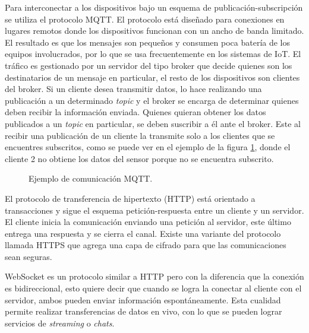 Para interconectar a los dispositivos bajo un esquema de publicación-subscripción se utiliza el protocolo MQTT.
El protocolo está diseñado para conexiones en lugares remotos donde los dispositivos funcionan con un ancho de banda limitado.
El resultado es que los mensajes son pequeños y consumen poca batería de los equipos involucrados, por lo que se usa frecuentemente en los sistemas de IoT.
El tráfico es gestionado por un servidor del tipo broker que decide quienes son los destinatarios de un mensaje en particular, el resto de los dispositivos son clientes del broker.
Si un cliente desea transmitir datos, lo hace realizando una publicación a un determinado \emph{topic} y el broker se encarga de determinar quienes deben recibir la información enviada.
Quienes quieran obtener los datos publicados a un \emph{topic} en particular, se deben suscribir a él ante el broker.
Este al recibir una publicación de un cliente la transmite solo a los clientes que se encuentres subscritos, como se puede ver en el ejemplo de la figura \ref{fig:ch1MqttEjemplo}, donde el cliente 2 no obtiene los datos del sensor porque no se encuentra subscrito.

\begin{figure}[h]
	\centering
	\caption{Ejemplo de comunicación MQTT.}
	\label{fig:ch1MqttEjemplo}
\end{figure}

El protocolo de transferencia de hipertexto (HTTP) está orientado a transacciones y sigue el esquema petición-respuesta entre un cliente y un servidor.
El cliente inicia la comunicación enviando una petición al servidor, este último entrega una respuesta y se cierra el canal.
Existe una variante del protocolo llamada HTTPS que agrega una capa de cifrado para que las comunicaciones sean seguras.

WebSocket es un protocolo similar a HTTP pero con la diferencia que la conexión es bidireccional, esto quiere decir que cuando se logra la conectar al cliente con el servidor, ambos pueden enviar información espontáneamente. Esta cualidad permite realizar transferencias de datos en vivo, con lo que se pueden lograr servicios de \emph{streaming} o \emph{chats}.

